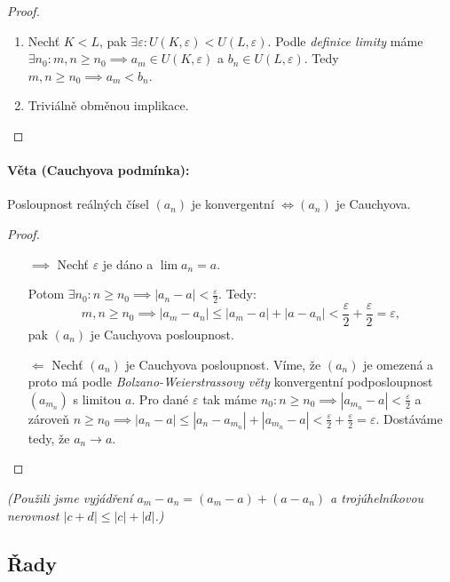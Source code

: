\documentclass[10pt,a4paper]{article}
\begin{document}
\begin{proof}
    $ $

    \begin{enumerate} 
        \item
    Nechť $K < L$, pak $\exists \varepsilon : U (K, \varepsilon) < U (L, \varepsilon)$.
    Podle \textit{definice limity} máme $\exists n_0 : m, n \geq n_0 \implies a_m \in U(K, \varepsilon)$ a $b_n \in U (L, \varepsilon)$. 
    Tedy $m, n \geq n_0 \implies a_m < b_n$.
        \item Triviálně obměnou implikace.
    \end{enumerate}

\end{proof}

\paragraph*{Věta (Cauchyova podmínka):} Posloupnost reálných čísel $(a_n)$ je konvergentní $\iff (a_n)$ je Cauchyova.

\begin{proof}
    \begin{itemize}
        \item [$\implies$] Nechť $\varepsilon$ je dáno a $\lim a_n = a$. 
        
        Potom $\exists n_0 : n\geq n_0 \implies |a_n - a| < \frac{\varepsilon}2$. Tedy:
        \[
            m,n\geq n_0 \implies |a_m - a_n| \leq |a_m - a| + |a-a_n| < \frac{\varepsilon}{2} + \frac{\varepsilon}{2} = \varepsilon,
        \] pak $(a_n)$ je Cauchyova posloupnost.
        \item [$\Longleftarrow$] Nechť $(a_n)$ je Cauchyova posloupnost. Víme, že $(a_n)$ je omezená a proto má podle \textit{Bolzano-Weierstrassovy věty} konvergentní podposloupnost $(a_{m_n})$ s limitou $a$.
        Pro dané $\varepsilon$ tak máme $n_0:n\geq n_0 \implies |a_{m_n} -a| < \frac{\varepsilon}{2}$ a zároveň $n\geq n_0 \implies |a_n -a| \leq |a_n-a_{m_n}| + |a_{m_n}-a| < \frac{\varepsilon}{2} + \frac{\varepsilon}{2} = \varepsilon.$
        Dostáváme tedy, že $a_n\to a$.
    \end{itemize}
\end{proof}

\textit{(Použili jsme vyjádření $a_m-a_n = (a_m - a)+ (a-a_n)$ a trojúhelníkovou nerovnost $|c+d| \leq |c| + |d|$.)}

\subsection{Řady}
\end{document}
